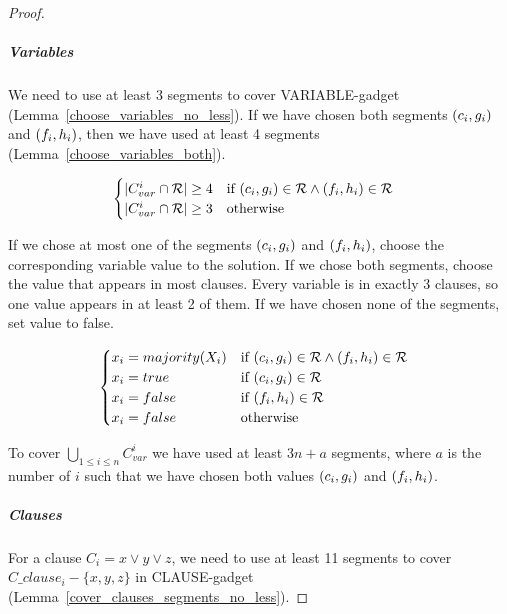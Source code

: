 \begin{proof}\leavevmode

\subparagraph{Variables}
We need to use at least 3 segments to cover VARIABLE-gadget
(Lemma~\ref{choose_variables_no_less}).
If we have chosen both segments $(c_i, g_i)$ and $(f_i, h_i)$,
then we have used at least 4 segments (Lemma~\ref{choose_variables_both}).


\begin{align}
	\begin{split}
	& \begin{cases}
	|C_{var}^i \cap \mathcal{R}| \ge 4 & \text{if}\ (c_i, g_i) \in \mathcal{R} \land (f_i, h_i) \in \mathcal{R} \\
	|C_{var}^i \cap \mathcal{R}| \ge 3 & \text{otherwise}
	\end{cases}
	\end{split}
\end{align}

If we chose at most one of the segments $(c_i, g_i)$ and $(f_i, h_i)$,
choose the corresponding variable value to the solution.
If we chose both segments,
choose the value that appears in most clauses.
Every variable is in exactly 3 clauses, so one value 
appears in at least 2 of them.
If we have chosen none of the segments, set value to false.

\begin{align}
	\begin{split}
	\label{eqn:variable_assignment}
	& \begin{cases}
	x_i = majority(X_i) & \text{if}\ (c_i, g_i) \in \mathcal{R} \land (f_i, h_i) \in \mathcal{R} \\
	x_i = true & \text{if}\ (c_i, g_i) \in \mathcal{R} \\
	x_i = false & \text{if}\ (f_i, h_i) \in \mathcal{R} \\
	x_i = false & \text{otherwise}
	\end{cases}
	\end{split}
\end{align}

To cover $\bigcup_{1 \le i \le n} C_{var}^i$
we have used at least $3n + a$ segments,
where $a$ is the number of $i$ such that we have chosen both
values $(c_i, g_i)$ and $(f_i, h_i)$.

\subparagraph{Clauses}

For a clause $C_i = x \lor y \lor z$,
we need to use at least 11 segments to cover $C\_clause_i - \{x, y, z\}$
in CLAUSE-gadget (Lemma~\ref{cover_clauses_segments_no_less}).


\end{proof}
